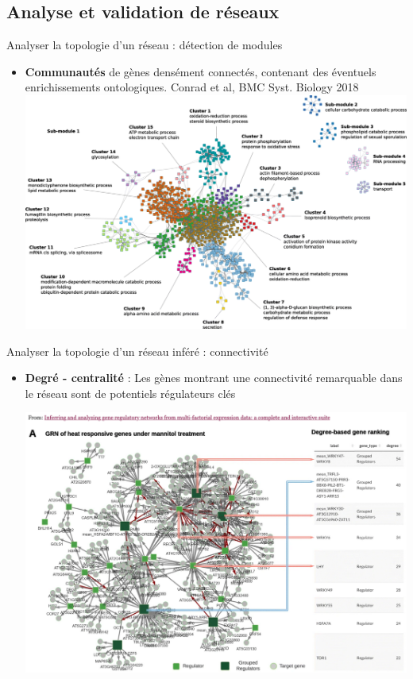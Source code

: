 \subsection{Analyse et validation de réseaux}



\begin{frame}{Analyser la topologie d'un réseau : détection de modules}

\begin{itemize}
    \item \small \textbf{Communautés} de gènes densément connectés, contenant des éventuels enrichissements ontologiques. \tiny{Conrad et al, BMC Syst. Biology 2018}
    \center
     \includegraphics[scale = 0.195]{Figures/analyse/modules.png} 
     
    
\end{itemize}
	
\end{frame}


\begin{frame}{Analyser la topologie d'un réseau inféré : connectivité}

\begin{itemize}
 \item \small \textbf{Degré - centralité} : Les gènes montrant une connectivité remarquable dans le réseau sont de potentiels régulateurs clés
 
 \center
     \includegraphics[scale = 0.17]{Figures/analyse/rankingTF.png}
    
\end{itemize}

\end{frame}


